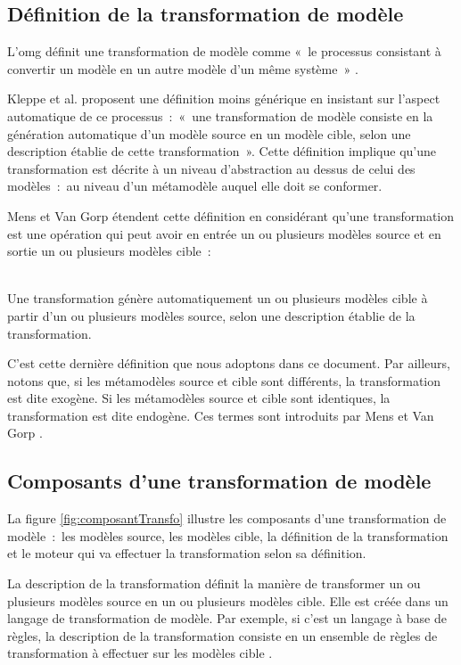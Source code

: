 \subsection{Définition de la transformation de modèle}
L'\gls{omg} définit une transformation de modèle comme «~le processus consistant à 
convertir un modèle en un autre modèle d'un même système~» \cite{omg2011meta}. 

Kleppe et al. \cite{kleppe2003mda} proposent une définition moins générique en insistant sur l'aspect automatique de ce processus~:~«~une transformation de modèle 
consiste en la génération automatique d'un modèle source en un modèle cible, 
selon une description établie de cette transformation~». Cette définition 
implique qu'une transformation est décrite à un niveau 
d'abstraction au dessus de celui des modèles~:~au niveau d'un métamodèle auquel elle doit se conformer. 

Mens et Van Gorp \cite{mens2006taxonomy} étendent cette définition en considérant qu'une 
transformation est une opération qui peut avoir en entrée un ou plusieurs 
modèles source et en sortie un ou plusieurs modèles cible~: 
\\\

\begin{definition}
Une transformation génère automatiquement un ou plusieurs modèles cible à partir 
d'un ou plusieurs modèles source, selon une description établie de la 
transformation. 
\end{definition}

C'est cette dernière définition que nous adoptons dans ce document. Par 
ailleurs, notons que, si les métamodèles source et cible sont différents, la 
transformation est dite exogène. Si les métamodèles source et cible 
sont identiques, la transformation est dite endogène. Ces 
termes sont introduits par Mens et Van Gorp \cite{mens2006taxonomy}.

\subsection{Composants d'une transformation de modèle} 
La figure \ref{fig:composantTransfo} illustre les composants d'une 
transformation de modèle~:~les modèles source, les modèles cible, la définition 
de la transformation et le moteur qui va effectuer la transformation selon sa 
définition. 

La description de la transformation définit la manière de transformer un ou plusieurs modèles source en un ou plusieurs modèles cible. Elle est créée dans 
un langage de transformation de modèle. Par exemple, si c'est un langage à base 
de règles, la description de la transformation consiste en un ensemble de règles 
de transformation à effectuer sur les modèles cible \cite{kleppe2003mda}. 

